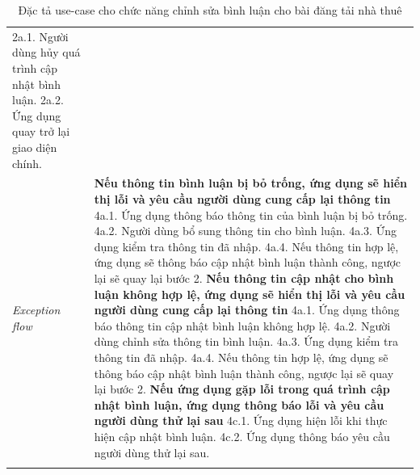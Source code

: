 \begin{center}
\begin{longtable}{
        |>{\raggedright\arraybackslash}p{3cm}
        |>{\raggedright\arraybackslash}p{13cm}
        |}
        2a.1. Người dùng hủy quá trình cập nhật bình luận. \newline
        2a.2. Ứng dụng quay trở lại giao diện chính.
        \\\hdashline
        \rowcolor{cyan!10!white} \textit{Exception flow} & 
        \textbf{Nếu thông tin bình luận bị bỏ trống, ứng dụng sẽ hiển thị lỗi và yêu cầu người dùng cung cấp lại thông tin} \newline
        4a.1. Ứng dụng thông báo thông tin của bình luận bị bỏ trống. \newline
        4a.2. Người dùng bổ sung thông tin cho bình luận. \newline
        4a.3. Ứng dụng kiểm tra thông tin đã nhập. \newline
        4a.4. Nếu thông tin hợp lệ, ứng dụng sẽ thông báo cập nhật bình luận thành công, ngược lại sẽ quay lại bước 2. \newline
        \textbf{Nếu thông tin cập nhật cho bình luận không hợp lệ, ứng dụng sẽ hiển thị lỗi và yêu cầu người dùng cung cấp lại thông tin} \newline
        4a.1. Ứng dụng thông báo thông tin cập nhật bình luận không hợp lệ. \newline
        4a.2. Người dùng chỉnh sửa thông tin bình luận. \newline
        4a.3. Ứng dụng kiểm tra thông tin đã nhập. \newline
        4a.4. Nếu thông tin hợp lệ, ứng dụng sẽ thông báo cập nhật bình luận thành công, ngược lại sẽ quay lại bước 2. \newline
        \textbf{Nếu ứng dụng gặp lỗi trong quá trình cập nhật bình luận, ứng dụng thông báo lỗi và yêu cầu người dùng thử lại sau} \newline
        4c.1. Ứng dụng hiện lỗi khi thực hiện cập nhật bình luận. \newline
        4c.2. Ứng dụng thông báo yêu cầu người dùng thử lại sau.
        \\\hline
        \caption{Đặc tả use-case cho chức năng chỉnh sửa bình luận cho bài đăng tải nhà thuê}
    \end{longtable}
\end{center}
